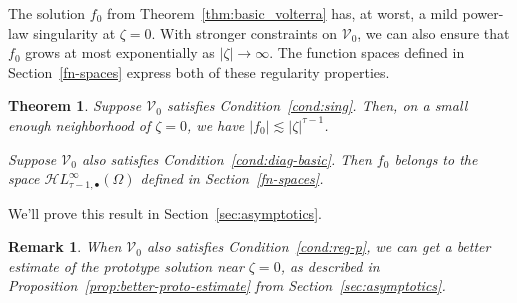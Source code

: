 \documentclass{article}
\theoremstyle{plain}
\newtheorem{thm}{Theorem}
\newtheorem{rmk}{Remark}
\newcommand{\singexp}[2]{\mathcal{H}L^\infty_{#1, #2}}
\newcommand{\singexpalg}[1]{\singexp{#1}{\bullet}}
\newcommand{\hardpart}{\mathcal{V}_0}
\newcommand{\solproto}{f_0}
\newcommand{\domain}{\Omega}
\begin{document}
The solution $\solproto$ from Theorem~\ref{thm:basic_volterra} has, at worst, a mild power-law singularity at $\zeta = 0$. With stronger constraints on $\hardpart$, we can also ensure that $\solproto$ grows at most exponentially as $|\zeta| \to \infty$. The function spaces defined in Section~\ref{fn-spaces} express both of these regularity properties.
\begin{thm}\label{thm:proto-growth}
Suppose $\hardpart$ satisfies {\em Condition~\eqref{cond:sing}}. Then, on a small enough neighborhood of $\zeta = 0$, we have $|\solproto| \lesssim |\zeta|^{\tau-1}$.

Suppose $\hardpart$ also satisfies {\em Condition~\eqref{cond:diag-basic}}. Then $f_0$ belongs to the space $\singexpalg{\tau-1}(\domain)$ defined in Section~\ref{fn-spaces}.
\end{thm}
We'll prove this result in Section~\ref{sec:asymptotics}.
\begin{rmk}
When $\hardpart$ also satisfies Condition~\eqref{cond:reg-p}, we can get a better estimate of the prototype solution near $\zeta = 0$, as described in Proposition~\ref{prop:better-proto-estimate} from Section~\ref{sec:asymptotics}.
\end{rmk}
\end{document}
